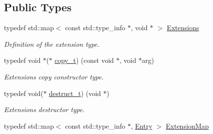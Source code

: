 \subsection*{Public Types}
\begin{DoxyCompactItemize}
\item 
typedef std\+::map$<$ const std\+::type\+\_\+info $\ast$, void $\ast$ $>$ \hyperlink{class_d_d4hep_1_1_object_extensions_a882c1e22567a450f60d83eb735dd3532}{Extensions}
\begin{DoxyCompactList}\small\item\em Definition of the extension type. \end{DoxyCompactList}\item 
typedef void $\ast$($\ast$ \hyperlink{class_d_d4hep_1_1_object_extensions_afb8207da7e2d6d5e3018cc7b5c997f6d}{copy\+\_\+t}) (const void $\ast$, void $\ast$arg)
\begin{DoxyCompactList}\small\item\em Extensions copy constructor type. \end{DoxyCompactList}\item 
typedef void($\ast$ \hyperlink{class_d_d4hep_1_1_object_extensions_a705a3524f9097577069a83993a39a9b2}{destruct\+\_\+t}) (void $\ast$)
\begin{DoxyCompactList}\small\item\em Extensions destructor type. \end{DoxyCompactList}\item 
typedef std\+::map$<$ const std\+::type\+\_\+info $\ast$, \hyperlink{struct_d_d4hep_1_1_object_extensions_1_1_entry}{Entry} $>$ \hyperlink{class_d_d4hep_1_1_object_extensions_a22c0e42d5fdc9f3fda39c2c3bec14341}{Extension\+Map}
\end{DoxyCompactItemize}
